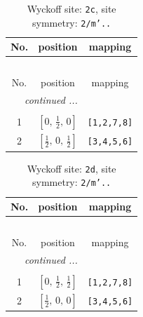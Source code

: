 \documentclass[fleqn,8pt]{jsarticle}
\begin{document}
\renewcommand{\arraystretch}{1.2}
\begin{longtable}{ccc}
\caption{Wyckoff site: {\tt 2c}, site symmetry: {\tt 2/m'..}}
 \\
 \hline \hline
No. & position & mapping \\ \hline \endfirsthead

\multicolumn{2}{l}{\tablename\ \thetable{}} \\
 \hline \hline
No. & position & mapping \\ \hline \endhead

 \hline \hline
\multicolumn{2}{r}{\footnotesize\it continued ...} \\ \endfoot

 \hline \hline
\multicolumn{2}{r}{} \\ \endlastfoot

1 & $\left[ 0,\, \frac{1}{2},\, 0 \right]$ & {\tt [1,2,7,8]} \\ \hline
2 & $\left[ \frac{1}{2},\, 0,\, \frac{1}{2} \right]$ & {\tt [3,4,5,6]} \\
\end{longtable}
\renewcommand{\arraystretch}{1.2}
\begin{longtable}{ccc}
\caption{Wyckoff site: {\tt 2d}, site symmetry: {\tt 2/m'..}}
 \\
 \hline \hline
No. & position & mapping \\ \hline \endfirsthead

\multicolumn{2}{l}{\tablename\ \thetable{}} \\
 \hline \hline
No. & position & mapping \\ \hline \endhead

 \hline \hline
\multicolumn{2}{r}{\footnotesize\it continued ...} \\ \endfoot

 \hline \hline
\multicolumn{2}{r}{} \\ \endlastfoot

1 & $\left[ 0,\, \frac{1}{2},\, \frac{1}{2} \right]$ & {\tt [1,2,7,8]} \\ \hline
2 & $\left[ \frac{1}{2},\, 0,\, 0 \right]$ & {\tt [3,4,5,6]} \\
\end{longtable}
\renewcommand{\arraystretch}{1.2}
\end{document}
